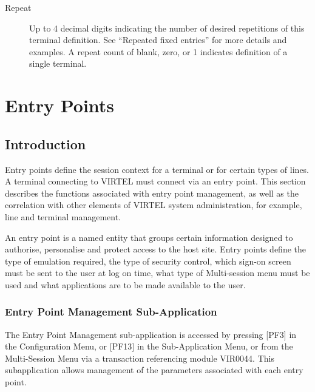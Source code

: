 \documentclass[letterpaper,10pt,english]{sphinxmanual}
\begin{document}
\begin{description}
\item[{Repeat}] \leavevmode
Up to 4 decimal digits indicating the number of desired repetitions of this terminal definition. See “Repeated fixed entries” for more details and examples.
A repeat count of blank, zero, or 1 indicates definition of a single terminal.

\end{description}

\ignorespaces 

\chapter{Entry Points}
\label{\detokenize{connectivity_guide:entry-points}}\label{\detokenize{connectivity_guide:index-102}}

\section{Introduction}
\label{\detokenize{connectivity_guide:id54}}
Entry points define the session context for a terminal or for certain types of lines. A terminal connecting to VIRTEL must connect via an entry point. This section describes the functions associated with entry point management, as well as the correlation with other elements of VIRTEL system administration, for example, line and terminal management.

An entry point is a named entity that groups certain information designed to authorise, personalise and protect access to the host site. Entry points define the type of emulation required, the type of security control, which sign-on screen must be sent to the user at log on time, what type of Multi-session menu must be used and what applications are to be made available to the user.

\ignorespaces 

\subsection{Entry Point Management Sub-Application}
\label{\detokenize{connectivity_guide:entry-point-management-sub-application}}\label{\detokenize{connectivity_guide:index-103}}
The Entry Point Management sub-application is accessed by pressing {[}PF3{]} in the Configuration Menu, or {[}PF13{]} in the Sub-Application Menu, or from the Multi-Session Menu via a transaction referencing module VIR0044. This subapplication allows management of the parameters associated with each entry point.
\end{document}
